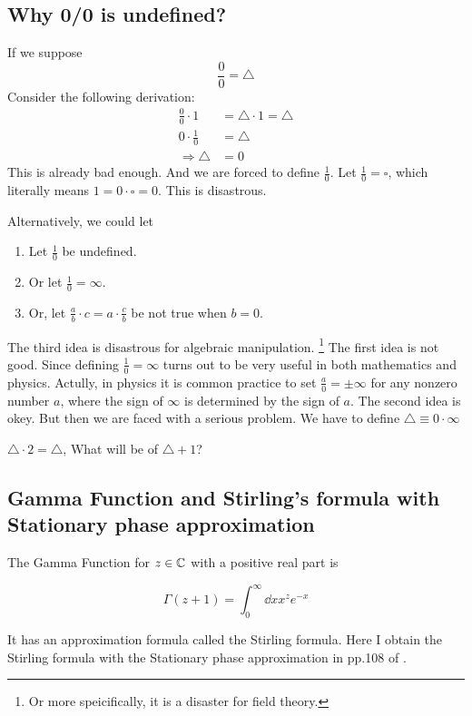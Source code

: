 \subsection{Why 0/0 is undefined?}
If we suppose
$$ \frac{0}{0}= \triangle $$
Consider the following derivation:
\begin{align}
\frac{0}{0} \cdot 1 &= \triangle \cdot 1 = \triangle \\
0 \cdot \frac{1}{0} &= \triangle\\
\Rightarrow \triangle &= 0
\end{align}
This is already bad enough. And we are forced to define $\frac{1}{0}$.
Let $\frac{1}{0} = \square$, which literally means $1=0\cdot \square = 0$.
This is disastrous.

Alternatively, we could let
\begin{enumerate}
   	\item Let $\frac{1}{0}$ be undefined.
   	\item Or let $\frac{1}{0} =
   	\infty$.
   	\item Or, let $\frac{a}{b}\cdot c= a\cdot \frac{c}{b}$ be not 
   	true when $b=0$.
\end{enumerate}
The third idea is disastrous for algebraic manipulation. \footnote{
   	Or more speicifically, it is a disaster for field theory.
}
The first idea is not good. Since defining $\frac{1}{0}=\infty$ turns
out to be very useful in both mathematics and physics. Actully, in
physics it is common practice to set $\frac{a}{0}=\pm\infty$ for
any nonzero number $a$, where the sign of $\infty$ is determined by 
the sign of $a$.
The second idea is okey. But then we are faced with a serious problem.
We have to define $\triangle \equiv 0 \cdot \infty$

$\triangle \cdot 2 = \triangle$, What will be of $\triangle + 1$?

\subsection{Gamma Function and Stirling's formula with Stationary phase
approximation}

The Gamma Function for $z\in\mathbb{C}$ with a positive real part is

\begin{equation}
    \Gamma(z+1) = \int_0^\infty \dd{x} x^z e^{-x}
\end{equation}

It has an approximation formula called the Stirling formula. Here I obtain the
Stirling formula with the Stationary phase approximation in pp.108 of
\cite{Altland2010}. 

